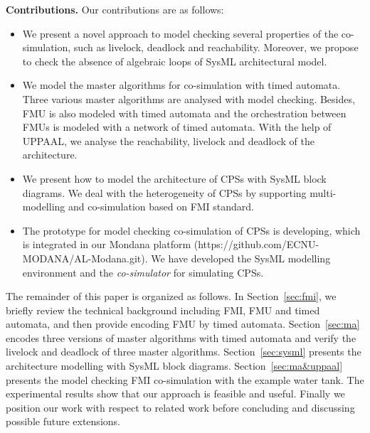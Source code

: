 \textbf{Contributions.} Our contributions are as follows:
\begin{itemize}
\item
We present a novel approach to model checking several properties of the co-simulation, such as livelock, deadlock and reachability. Moreover, we propose to check the absence of algebraic loops of SysML architectural model.
\item
We model the master algorithms for co-simulation with timed automata. Three various master algorithms are analysed with model checking. Besides, FMU is also modeled with timed automata and the orchestration between FMUs is modeled with a network of timed automata. With the help of UPPAAL, we analyse the reachability, livelock and deadlock of the architecture.
\item
We present how to model the architecture of CPSs with SysML block diagrams. We deal with the heterogeneity of CPSs by supporting multi-modelling and co-simulation based on FMI standard.
\item
The prototype for model checking co-simulation of CPSs is developing, which is integrated in our Mondana platform \cite{Cheng2015Modana}(https://github.com/ECNU-MODANA/AL-Modana.git). We have developed the SysML modelling environment and the \textit{co-simulator }for simulating CPSs\cite{Fritzson1998Modelica}.
\end{itemize}
The remainder of this paper is organized as follows. In Section~\ref{sec:fmi}, we briefly review the technical background including FMI, FMU and timed automata, and then provide encoding FMU by timed automata.
Section~\ref{sec:ma} encodes three versions of master algorithms with timed automata and verify the livelock and deadlock of three master algorithms.
Section~\ref{sec:sysml} presents the architecture modelling with SysML block diagrams.
Section~\ref{sec:ma&uppaal} presents the model checking FMI co-simulation with the example water tank. The experimental results show that our approach is feasible and useful. 
Finally we position our work with respect to related work before concluding and discussing possible future extensions.




















